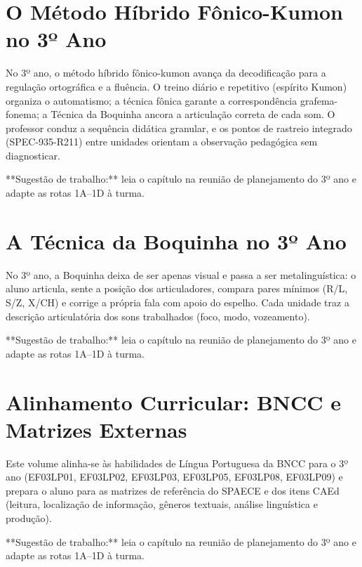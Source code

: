 
\chapter{O Método Híbrido Fônico-Kumon no 3º Ano}

No 3º ano, o método híbrido fônico-kumon avança da decodificação para a regulação ortográfica e a fluência. O treino diário e repetitivo (espírito Kumon) organiza o automatismo; a técnica fônica garante a correspondência grafema-fonema; a Técnica da Boquinha ancora a articulação correta de cada som. O professor conduz a sequência didática granular, e os pontos de rastreio integrado (SPEC-935-R211) entre unidades orientam a observação pedagógica sem diagnosticar.


\begin{dica}
**Sugestão de trabalho:** leia o capítulo na reunião de planejamento do 3º ano e adapte as rotas 1A–1D à turma.
\end{dica}

\chapter{A Técnica da Boquinha no 3º Ano}

No 3º ano, a Boquinha deixa de ser apenas visual e passa a ser metalinguística: o aluno articula, sente a posição dos articuladores, compara pares mínimos (R/L, S/Z, X/CH) e corrige a própria fala com apoio do espelho. Cada unidade traz a descrição articulatória dos sons trabalhados (foco, modo, vozeamento).


\begin{dica}
**Sugestão de trabalho:** leia o capítulo na reunião de planejamento do 3º ano e adapte as rotas 1A–1D à turma.
\end{dica}

\chapter{Alinhamento Curricular: BNCC e Matrizes Externas}

Este volume alinha-se às habilidades de Língua Portuguesa da BNCC para o 3º ano (EF03LP01, EF03LP02, EF03LP03, EF03LP05, EF03LP08, EF03LP09) e prepara o aluno para as matrizes de referência do SPAECE e dos itens CAEd (leitura, localização de informação, gêneros textuais, análise linguística e produção).


\begin{dica}
**Sugestão de trabalho:** leia o capítulo na reunião de planejamento do 3º ano e adapte as rotas 1A–1D à turma.
\end{dica}

